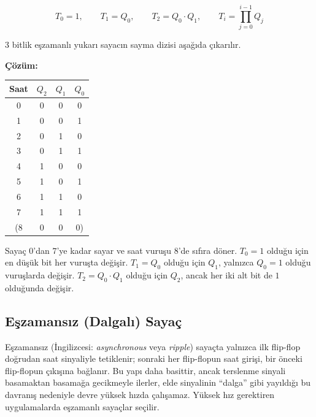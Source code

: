 \[
T_0 = 1, \qquad T_1 = Q_0, \qquad T_2 = Q_0 \cdot Q_1, \qquad T_i = \prod_{j=0}^{i-1} Q_j
\]

\begin{ornek}[B.15]
3 bitlik eşzamanlı yukarı sayacın sayma dizisi aşağıda çıkarılır.

\textbf{Çözüm:}

\begin{table}[H]
\centering
\begin{tabular}{c|ccc}
\toprule
\textbf{Saat} & $Q_2$ & $Q_1$ & $Q_0$ \\
\midrule
0 & 0 & 0 & 0 \\
1 & 0 & 0 & 1 \\
2 & 0 & 1 & 0 \\
3 & 0 & 1 & 1 \\
4 & 1 & 0 & 0 \\
5 & 1 & 0 & 1 \\
6 & 1 & 1 & 0 \\
7 & 1 & 1 & 1 \\
(8 & 0 & 0 & 0) \\
\bottomrule
\end{tabular}
\end{table}

Sayaç $0$'dan $7$'ye kadar sayar ve saat vuruşu 8'de sıfıra döner. $T_0 = 1$ olduğu için en düşük bit her vuruşta değişir. $T_1 = Q_0$ olduğu için $Q_1$, yalnızca $Q_0 = 1$ olduğu vuruşlarda değişir. $T_2 = Q_0 \cdot Q_1$ olduğu için $Q_2$, ancak her iki alt bit de $1$ olduğunda değişir.
\end{ornek}

\subsection{Eşzamansız (Dalgalı) Sayaç}

Eşzamansız (İngilizcesi: \textit{asynchronous} veya \textit{ripple}) sayaçta yalnızca ilk flip-flop doğrudan saat sinyaliyle tetiklenir; sonraki her flip-flopun saat girişi, bir önceki flip-flopun çıkışına bağlanır. Bu yapı daha basittir, ancak terslenme sinyali basamaktan basamağa gecikmeyle ilerler, elde sinyalinin ``dalga'' gibi yayıldığı bu davranış nedeniyle devre yüksek hızda çalışamaz. Yüksek hız gerektiren uygulamalarda eşzamanlı sayaçlar seçilir.

